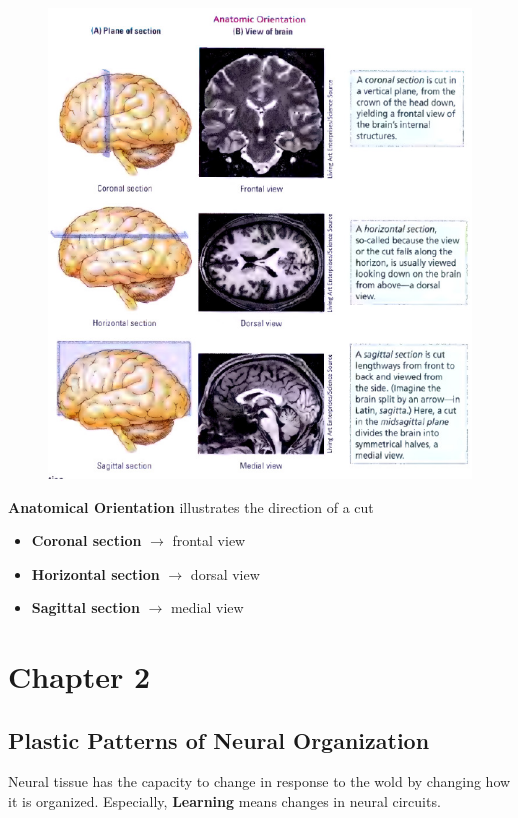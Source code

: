 \documentclass[12pt]{article}
\begin{document}
\begin{figure}[H]
    \includegraphics[width=\textwidth]{anatomical_orientation.png}
\end{figure}

\noindent \textbf{Anatomical Orientation}
illustrates the direction of a cut
\begin{itemize}
\item {\textbf{Coronal section}     \(\rightarrow\) frontal view}
\item {\textbf{Horizontal section}  \(\rightarrow\) dorsal view}
\item {\textbf{Sagittal section}    \(\rightarrow\) medial view}
\end{itemize}

\newpage
\section{Chapter 2}
\subsection{Plastic Patterns of Neural Organization}
Neural tissue has the capacity to change in response to the wold by changing how it is organized. Especially, \textbf{Learning} means changes in neural circuits.
\end{document}
